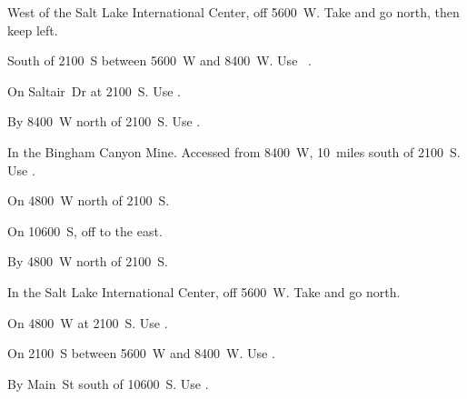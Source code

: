 
\begin{LocationList}

West of the Salt Lake International Center, off 5600~W.
Take   and go north, then keep left.

South of  2100~S between  5600~W and 8400~W.
Use~ .

On  Saltair~Dr at  2100~S.
Use  .

By 8400~W north of  2100~S.
Use  .

In the Bingham Canyon Mine.
Accessed from 8400~W, 10~miles south of  2100~S.
Use  .

\Location{\GarageHQ \Garage}
On 4800~W north of  2100~S.

On 10600~S, off   to the east.

\Location{\RecruitmentAgency \Recruitment}
By 4800~W north of  2100~S.

In the Salt Lake International Center, off 5600~W.
Take   and go north.

\Location{\TruckStop \Gas \Rest \Weigh}
On 4800~W at  2100~S.
Use  .

On  2100~S between  5600~W and 8400~W.
Use  .

By Main~St south of  10600~S.
Use  .

\end{LocationList}
